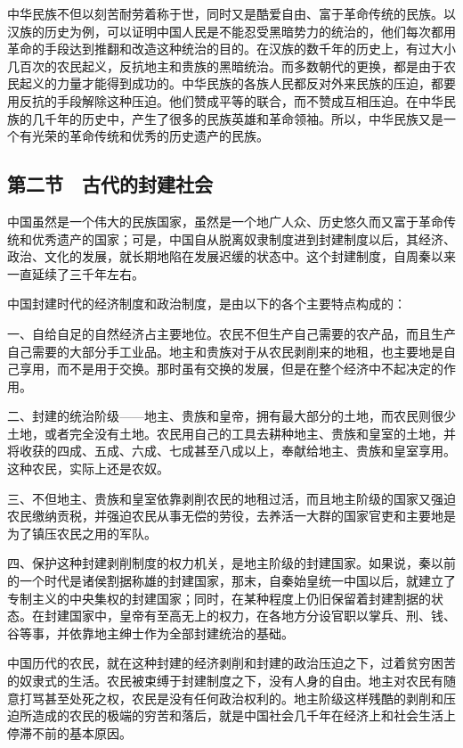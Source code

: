 中华民族不但以刻苦耐劳着称于世，同时又是酷爱自由、富于革命传统的民族。以汉族的历史为例，可以证明中国人民是不能忍受黑暗势力的统治的，他们每次都用革命的手段达到推翻和改造这种统治的目的。在汉族的数千年的历史上，有过大小几百次的农民起义，反抗地主和贵族的黑暗统治。而多数朝代的更换，都是由于农民起义的力量才能得到成功的。中华民族的各族人民都反对外来民族的压迫，都要用反抗的手段解除这种压迫。他们赞成平等的联合，而不赞成互相压迫。在中华民族的几千年的历史中，产生了很多的民族英雄和革命领袖。所以，中华民族又是一个有光荣的革命传统和优秀的历史遗产的民族。

\subsection{第二节　古代的封建社会}

中国虽然是一个伟大的民族国家，虽然是一个地广人众、历史悠久而又富于革命传统和优秀遗产的国家；可是，中国自从脱离奴隶制度进到封建制度以后，其经济、政治、文化的发展，就长期地陷在发展迟缓的状态中。这个封建制度，自周秦以来一直延续了三千年左右。

中国封建时代的经济制度和政治制度，是由以下的各个主要特点构成的：

一、自给自足的自然经济占主要地位。农民不但生产自己需要的农产品，而且生产自己需要的大部分手工业品。地主和贵族对于从农民剥削来的地租，也主要地是自己享用，而不是用于交换。那时虽有交换的发展，但是在整个经济中不起决定的作用。

二、封建的统治阶级——地主、贵族和皇帝，拥有最大部分的土地，而农民则很少土地，或者完全没有土地。农民用自己的工具去耕种地主、贵族和皇室的土地，并将收获的四成、五成、六成、七成甚至八成以上，奉献给地主、贵族和皇室享用。这种农民，实际上还是农奴。

三、不但地主、贵族和皇室依靠剥削农民的地租过活，而且地主阶级的国家又强迫农民缴纳贡税，并强迫农民从事无偿的劳役，去养活一大群的国家官吏和主要地是为了镇压农民之用的军队。

四、保护这种封建剥削制度的权力机关，是地主阶级的封建国家。如果说，秦以前的一个时代是诸侯割据称雄的封建国家，那末，自秦始皇统一中国以后，就建立了专制主义的中央集权的封建国家；同时，在某种程度上仍旧保留着封建割据的状态。在封建国家中，皇帝有至高无上的权力，在各地方分设官职以掌兵、刑、钱、谷等事，并依靠地主绅士作为全部封建统治的基础。

中国历代的农民，就在这种封建的经济剥削和封建的政治压迫之下，过着贫穷困苦的奴隶式的生活。农民被束缚于封建制度之下，没有人身的自由。地主对农民有随意打骂甚至处死之权，农民是没有任何政治权利的。地主阶级这样残酷的剥削和压迫所造成的农民的极端的穷苦和落后，就是中国社会几千年在经济上和社会生活上停滞不前的基本原因。

